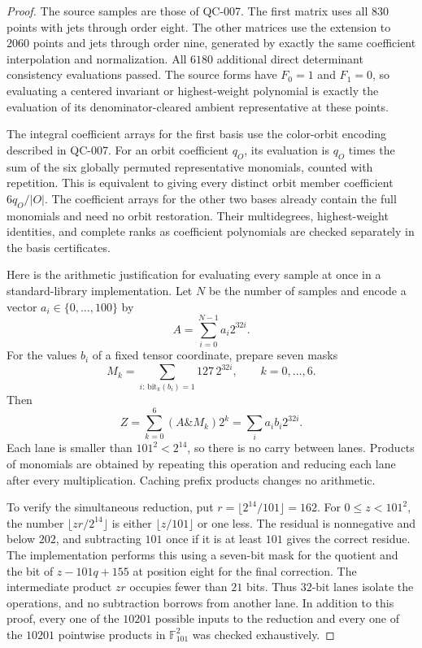 \begin{proof}
The source samples are those of QC-007. The first matrix uses all
$830$ points with jets through order eight. The other matrices use
the extension to $2060$ points and jets through order nine, generated
by exactly the same coefficient interpolation and normalization.
All $6180$ additional direct determinant consistency evaluations passed.
The source forms have $F_0=1$ and $F_1=0$, so evaluating a centered
invariant or highest-weight polynomial is exactly the evaluation of
its denominator-cleared ambient representative at these points.

The integral coefficient arrays for the first basis use the color-orbit
encoding described in QC-007. For an orbit coefficient $q_O$, its
evaluation is $q_O$ times the sum of the six globally permuted
representative monomials, counted with repetition. This is equivalent
to giving every distinct orbit member coefficient $6q_O/|O|$.
The coefficient arrays for the other two bases already contain the
full monomials and need no orbit restoration. Their multidegrees,
highest-weight identities, and complete ranks as coefficient
polynomials are checked separately in the basis certificates.

Here is the arithmetic justification for evaluating every sample at
once in a standard-library implementation. Let $N$ be the number
of samples and encode a vector $a_i\in\{0,\ldots,100\}$ by
\[
 A=\sum_{i=0}^{N-1}a_i2^{32i}.
\]
For the values $b_i$ of a fixed tensor coordinate, prepare seven masks
\[
 M_k=\sum_{i:\,\text{bit}_k(b_i)=1}127\,2^{32i},
 \qquad k=0,\ldots,6.
\]
Then
\[
 Z=\sum_{k=0}^{6}(A\mathbin{\&}M_k)2^k
       =\sum_i a_ib_i2^{32i}.
 \tag{QC-008.3}
\]
Each lane is smaller than $101^2<2^{14}$, so there is no carry
between lanes. Products of monomials are obtained by repeating this
operation and reducing each lane after every multiplication. Caching
prefix products changes no arithmetic.

To verify the simultaneous reduction, put $r=\lfloor2^{14}/101\rfloor=162$.
For $0\leq z<101^2$, the number
$\lfloor zr/2^{14}\rfloor$ is either $\lfloor z/101\rfloor$ or
one less. The residual is nonnegative and below $202$, and subtracting
$101$ once if it is at least $101$ gives the correct residue. The
implementation performs this using a seven-bit mask for the quotient
and the bit of $z-101q+155$ at position eight for the final correction.
The intermediate product $zr$ occupies fewer than $21$ bits. Thus
$32$-bit lanes isolate the operations, and no subtraction borrows from
another lane. In addition to this proof, every one of the $10201$
possible inputs to the reduction and every one of the $10201$
pointwise products in $\mathbb F_{101}^2$ was checked exhaustively.


\end{proof}
